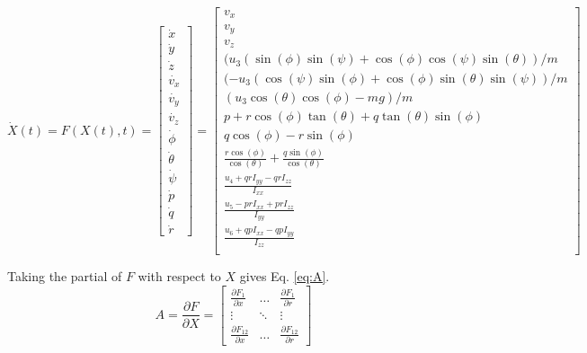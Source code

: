\documentclass[letterpaper, preprint, paper,11pt]{AAS}	%
\begin{document}
\begin{equation}
\label{eq:Xdot}
\dot{X}(t) = F(X(t), t) = \begin{bmatrix}
\dot{x} \\ \dot{y} \\ \dot{z} \\ \dot{v_x} \\ \dot{v_y} \\ \dot{v_z} \\ \dot{\phi} \\ \dot{\theta} \\ \dot{\psi} \\ \dot{p} \\ \dot{q} \\ \dot{r} 
\end{bmatrix} =  \begin{bmatrix}
v_x \\
v_y \\
v_z \\
(u_3(\sin(\phi)\sin(\psi) + \cos(\phi)\cos(\psi)\sin(\theta))/m \\
(-u_3(\cos(\psi)\sin(\phi) + \cos(\phi)\sin(\theta)\sin(\psi))/m \\
(u_3\cos(\theta)\cos(\phi) - mg)/m \\
p + r\cos(\phi)\tan(\theta) + q\tan(\theta)\sin(\phi) \\
q\cos(\phi) - r\sin(\phi) \\
\frac{r\cos(\phi)}{\cos(\theta)} + \frac{q\sin(\phi)}{\cos(\theta)} \\
\frac{u_4 + qrI_{yy} - qrI_{zz}}{I_{xx}} \\
\frac{u_5 - prI_{xx} + prI_{zz}}{I_{yy}} \\
\frac{u_6 + qpI_{xx} - qpI_{yy}}{I_{zz}} \\
\end{bmatrix}
\end{equation}

Taking the partial of $F$ with respect to $X$ gives Eq. \eqref{eq:A}.
\begin{equation}
\label{eq:A}
A = \frac{\partial F}{\partial X} = 
\begin{bmatrix} 
    \frac{\partial F_1}{\partial x} & \dots  & \frac{\partial F_1}{\partial r}\\
    \vdots & \ddots & \vdots\\
    \frac{\partial F_{12}}{\partial x} & \dots  & \frac{\partial F_{12}}{\partial r} 
\end{bmatrix}
\end{equation}
\end{document}

